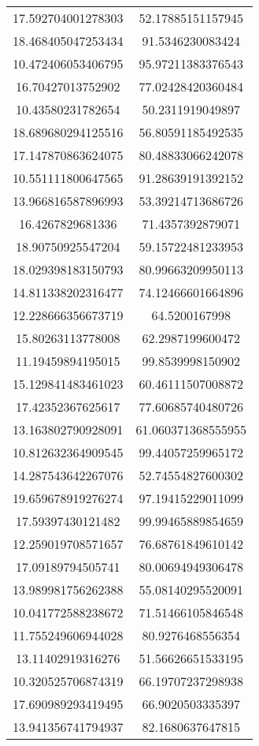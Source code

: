 \begin{table}
\begin{tabular}{cc}
17.592704001278303 & 52.17885151157945 \\
18.468405047253434 & 91.5346230083424 \\
10.472406053406795 & 95.97211383376543 \\
16.70427013752902 & 77.02428420360484 \\
10.43580231782654 & 50.2311919049897 \\
18.689680294125516 & 56.80591185492535 \\
17.147870863624075 & 80.48833066242078 \\
10.551111800647565 & 91.28639191392152 \\
13.966816587896993 & 53.39214713686726 \\
16.4267829681336 & 71.4357392879071 \\
18.90750925547204 & 59.15722481233953 \\
18.029398183150793 & 80.99663209950113 \\
14.811338202316477 & 74.12466601664896 \\
12.228666356673719 & 64.5200167998 \\
15.80263113778008 & 62.2987199600472 \\
11.19459894195015 & 99.8539998150902 \\
15.129841483461023 & 60.46111507008872 \\
17.42352367625617 & 77.60685740480726 \\
13.163802790928091 & 61.060371368555955 \\
10.812632364909545 & 99.44057259965172 \\
14.287543642267076 & 52.74554827600302 \\
19.659678919276274 & 97.19415229011099 \\
17.59397430121482 & 99.99465889854659 \\
12.259019708571657 & 76.68761849610142 \\
17.09189794505741 & 80.00694949306478 \\
13.989981756262388 & 55.08140295520091 \\
10.041772588238672 & 71.51466105846548 \\
11.755249606944028 & 80.9276468556354 \\
13.11402919316276 & 51.56626651533195 \\
10.320525706874319 & 66.19707237298938 \\
17.690989293419495 & 66.9020503335397 \\
13.941356741794937 & 82.1680637647815 \\

\end{tabular}
\end{table}

